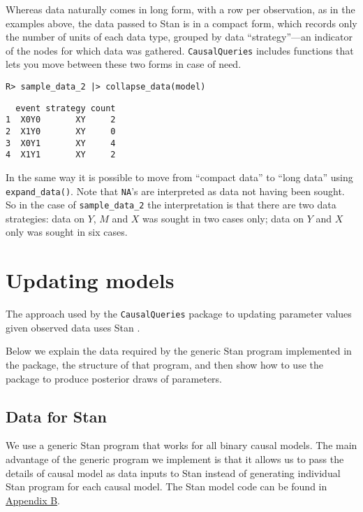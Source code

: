 \documentclass[
  11pt,
  article]{jss}
\begin{document}
Whereas data naturally comes in long form, with a row per observation,
as in the examples above, the data passed to Stan is in a compact form,
which records only the number of units of each data type, grouped by
data ``strategy''---an indicator of the nodes for which data was
gathered. \texttt{CausalQueries} includes functions that lets you move
between these two forms in case of need.

\begin{verbatim}
R> sample_data_2 |> collapse_data(model)
\end{verbatim}

\begin{verbatim}
  event strategy count
1  X0Y0       XY     2
2  X1Y0       XY     0
3  X0Y1       XY     4
4  X1Y1       XY     2
\end{verbatim}

In the same way it is possible to move from ``compact data'' to ``long
data'' using \texttt{expand\_data()}. Note that \texttt{NA}'s are
interpreted as data not having been sought. So in the case of
\texttt{sample\_data\_2} the interpretation is that there are two data
strategies: data on \(Y\), \(M\) and \(X\) was sought in two cases only;
data on \(Y\) and \(X\) only was sought in six cases.

\hypertarget{sec-update}{%
\section{Updating models}\label{sec-update}}

The approach used by the \texttt{CausalQueries} package to updating
parameter values given observed data uses Stan
\citep{carpenter_stan_2017}.

Below we explain the data required by the generic Stan program
implemented in the package, the structure of that program, and then show
how to use the package to produce posterior draws of parameters.

\hypertarget{data-for-stan}{%
\subsection{Data for Stan}\label{data-for-stan}}

We use a generic Stan program that works for all binary causal models.
The main advantage of the generic program we implement is that it allows
us to pass the details of causal model as data inputs to Stan instead of
generating individual Stan program for each causal model. The Stan model
code can be found in \protect\hyperlink{sec-stancode}{Appendix B}.
\end{document}
